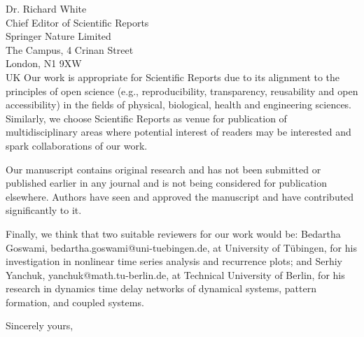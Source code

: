 \documentclass[10pt]{letter}
\begin{document}
\begin{letter}{Dr. Richard White \\
Chief Editor of Scientific Reports \\
Springer Nature Limited \\
The Campus, 4 Crinan Street\\
London, N1 9XW \\
UK
}
Our work is appropriate for Scientific Reports due to its alignment to the principles of open science (e.g., reproducibility, transparency, reusability and open accessibility) in the fields of physical, biological, health and engineering sciences.
Similarly, we choose Scientific Reports as venue for publication of multidisciplinary areas where potential interest of readers may be interested and spark collaborations of our work.

Our manuscript contains original research and has not been submitted or published earlier in any journal and is not being considered for publication elsewhere.   
Authors have seen and approved the manuscript and have contributed significantly to it.

Finally, we think that two suitable reviewers for our work would be: 
Bedartha Goswami, bedartha.goswami@uni-tuebingen.de, at University of Tübingen, for his investigation in nonlinear time series analysis and recurrence plots; 
and Serhiy Yanchuk, yanchuk@math.tu-berlin.de, at Technical University of Berlin, for his research in dynamics time delay networks of dynamical systems, pattern formation, and coupled systems.  

\closing{Sincerely yours,}


\end{letter}
\end{document}
